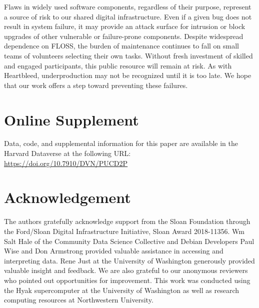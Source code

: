 \documentclass[10pt,conference]{IEEEtran}\usepackage[]{graphicx}\usepackage[usenames,dvipsnames]{color}
\begin{document}
Flaws in widely used software components, regardless of their purpose, represent a source of risk to our shared digital infrastructure. Even if a given bug does not result in system failure, it may provide an attack surface for intrusion or block upgrades of other vulnerable or failure-prone components. Despite widespread dependence on FLOSS, the burden of maintenance continues to fall on small teams of volunteers selecting their own tasks. Without fresh investment of skilled and engaged participants, this public resource will remain at risk. As with Heartbleed, underproduction may not be recognized until it is too late. We hope that our work offers a step toward preventing these failures. 

\section*{Online Supplement}
\label{sec:supplement}

Data, code, and supplemental information for this paper are available in the Harvard Dataverse at the following URL: \url{https://doi.org/10.7910/DVN/PUCD2P}

\section*{Acknowledgement}
 The authors gratefully acknowledge support from the Sloan Foundation through the Ford/Sloan Digital Infrastructure Initiative, Sloan Award 2018-11356. Wm Salt Hale of the Community Data Science Collective and Debian Developers Paul Wise and Don Armstrong provided valuable assistance in accessing and interpreting data. Rene Just at the University of Washington generously provided valuable insight and feedback. We are also grateful to our anonymous reviewers who pointed out opportunities for improvement. This work was conducted using the Hyak supercomputer at the University of Washington as well as research computing resources at Northwestern University.

\balance


   
\end{document}

